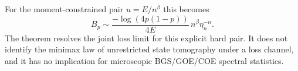 \documentclass[11pt,a4paper]{article}
\numberwithin{equation}{section}
\begin{document}
For the moment-constrained pair $u=E/n^\beta$ this becomes
\[
 B_p\sim\frac{-\log(4p(1-p))}{4E}\,n^\beta\eta_n^{-n}. \tag{PL.9}
\]
The theorem resolves the joint loss limit for this explicit hard pair. It
does not identify the minimax law of unrestricted state tomography under a
loss channel, and it has no implication for microscopic BGS/GOE/COE spectral
statistics.






\end{document}
